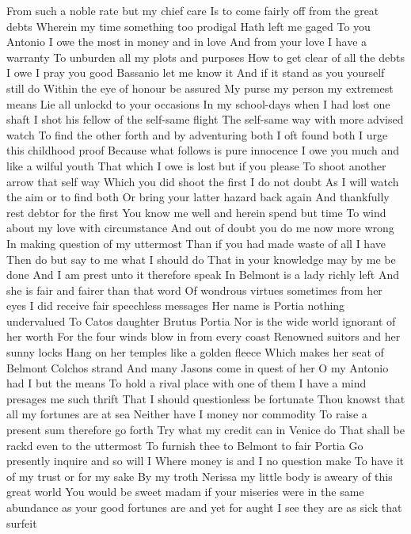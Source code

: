 From such a noble rate but my chief care 
Is to come fairly off from the great debts 
Wherein my time something too prodigal 
Hath left me gaged To you Antonio 
I owe the most in money and in love 
And from your love I have a warranty 
To unburden all my plots and purposes 
How to get clear of all the debts I owe 
I pray you good Bassanio let me know it 
And if it stand as you yourself still do 
Within the eye of honour be assured 
My purse my person my extremest means 
Lie all unlockd to your occasions 
In my school-days when I had lost one shaft 
I shot his fellow of the self-same flight 
The self-same way with more advised watch 
To find the other forth and by adventuring both 
I oft found both I urge this childhood proof 
Because what follows is pure innocence 
I owe you much and like a wilful youth 
That which I owe is lost but if you please 
To shoot another arrow that self way 
Which you did shoot the first I do not doubt 
As I will watch the aim or to find both 
Or bring your latter hazard back again 
And thankfully rest debtor for the first 
You know me well and herein spend but time 
To wind about my love with circumstance 
And out of doubt you do me now more wrong 
In making question of my uttermost 
Than if you had made waste of all I have 
Then do but say to me what I should do 
That in your knowledge may by me be done 
And I am prest unto it therefore speak 
In Belmont is a lady richly left 
And she is fair and fairer than that word 
Of wondrous virtues sometimes from her eyes 
I did receive fair speechless messages 
Her name is Portia nothing undervalued 
To Catos daughter Brutus Portia 
Nor is the wide world ignorant of her worth 
For the four winds blow in from every coast 
Renowned suitors and her sunny locks 
Hang on her temples like a golden fleece 
Which makes her seat of Belmont Colchos strand 
And many Jasons come in quest of her 
O my Antonio had I but the means 
To hold a rival place with one of them 
I have a mind presages me such thrift 
That I should questionless be fortunate 
Thou knowst that all my fortunes are at sea 
Neither have I money nor commodity 
To raise a present sum therefore go forth 
Try what my credit can in Venice do 
That shall be rackd even to the uttermost 
To furnish thee to Belmont to fair Portia 
Go presently inquire and so will I 
Where money is and I no question make 
To have it of my trust or for my sake 
By my troth Nerissa my little body is aweary of 
this great world 
You would be sweet madam if your miseries were in 
the same abundance as your good fortunes are and 
yet for aught I see they are as sick that surfeit 
